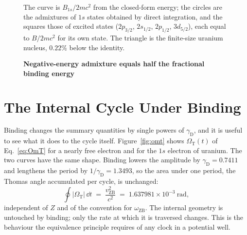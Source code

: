 \documentclass[%
 reprint, amsmath,amssymb, aps, prb, ]{revtex4-2}
\numberwithin{equation}{section}
\newcommand{\omZB}{\omega_{\text{ZB}}}
\newcommand{\vZB}{v_{\text{ZB}}}
\newcommand{\OmT}{\Omega_{\text{T}}}
\newcommand{\gammaD}{\gamma_{\text{D}}}
\begin{document}
\begin{figure}[t!]
\centering
{}
\caption{\textbf{Negative-energy admixture equals half the fractional binding energy}}
\label{fig:admix}
\vspace{0.4em}
\begin{minipage}{0.95\columnwidth}
\justifying\small
The curve is $B_{1s}/2mc^{2}$ from the closed-form energy; the circles are the admixtures of $1s$ states obtained by direct integration, and the squares those of excited states ($2p_{3/2}$, $2s_{1/2}$, $2p_{1/2}$, $3d_{5/2}$), each equal to $B/2mc^{2}$ for its own state. The triangle is the finite-size uranium nucleus, $0.22\%$ below the identity.
\end{minipage}
\end{figure}

\section{The Internal Cycle Under Binding}
\label{sec:cycle}

Binding changes the summary quantities by single powers of $\gammaD$, and it is useful to see what it does to the cycle itself. Figure~\ref{fig:omt} shows $\OmT(t)$ of Eq.~\eqref{eq:OmT} for a nearly free electron and for the $1s$ electron of uranium. The two curves have the same shape. Binding lowers the amplitude by $\gammaD = 0.7411$ and lengthens the period by $1/\gammaD = 1.3493$, so the area under one period, the Thomas angle accumulated per cycle, is unchanged:
\begin{equation}
\oint \lvert\OmT\rvert\,\dd t \;=\; \frac{\vZB^{2}}{c^{2}} \;=\; 1.637981\times10^{-3}\ \text{rad},
\label{eq:invariant}
\end{equation}
independent of $Z$ and of the convention for $\omZB$. The internal geometry is untouched by binding; only the rate at which it is traversed changes. This is the behaviour the equivalence principle requires of any clock in a potential well.
\end{document}
